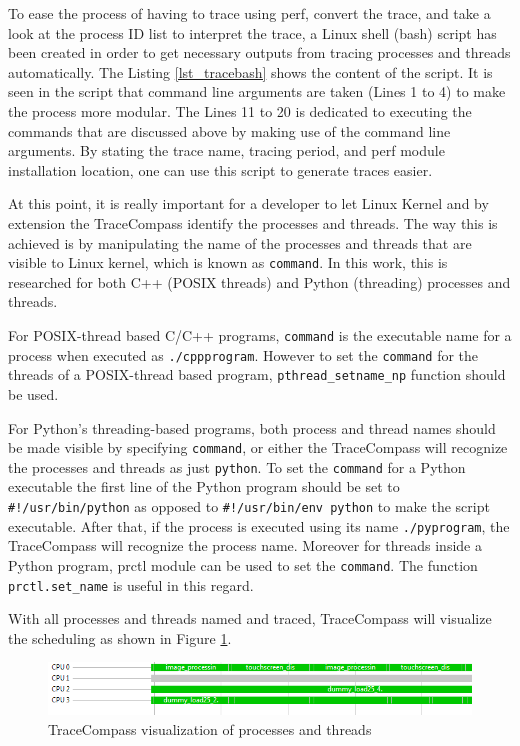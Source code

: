\begin{itemize}
	To ease the process of having to trace using perf, convert the trace, and take a look at the process ID list to interpret the trace, a Linux shell (bash) script has been created in order to get necessary outputs from tracing processes and threads automatically. The Listing \ref{lst_tracebash} shows the content of the script. It is seen in the script that command line arguments are taken (Lines 1 to 4) to make the process more modular. The Lines 11 to 20 is dedicated to executing the commands that are discussed above by making use of the command line arguments. By stating the trace name, tracing period, and perf module installation location, one can use this script to generate traces easier. 
	\newpage
	
	
	At this point, it is really important for a developer to let Linux Kernel and by extension the TraceCompass identify the processes and threads. The way this is achieved is by manipulating the name of the processes and threads that are visible to Linux kernel, which is known as \texttt{command}. In this work, this is researched for both C++ (POSIX threads) and Python (threading) processes and threads.
	
	For POSIX-thread based C/C++ programs, \texttt{command} is the executable name for a process when executed as \texttt{./cppprogram}. However to set the \texttt{command} for the threads of a POSIX-thread based program, \texttt{pthread{\_}setname{\_}np} function should be used.
	
	For Python's threading-based programs, both process and thread names should be made visible by specifying \texttt{command}, or either the TraceCompass will recognize the processes and threads as just \texttt{python}. To set the \texttt{command} for a Python executable the first line of the Python program should be set to \texttt{\#!/usr/bin/python} as opposed to \texttt{\#!/usr/bin/env python} to make the script executable. After that, if the process is executed using its name \texttt{./pyprogram}, the TraceCompass will recognize the process name. Moreover for threads inside a Python program, prctl module can be used to set the \texttt{command}. The function \texttt{prctl.set{\_}name} is useful in this regard.
	
	With all processes and threads named and traced, TraceCompass will visualize the scheduling as shown in Figure \ref{fig:tracecompasscommands}.
	
	\begin{figure}[!ht]
		\centering
		\includegraphics[width=\textwidth]{content/images/tracecompasscommands.png}
		\caption{TraceCompass visualization of processes and threads}
		\label{fig:tracecompasscommands}
	\end{figure}
\end{itemize}

